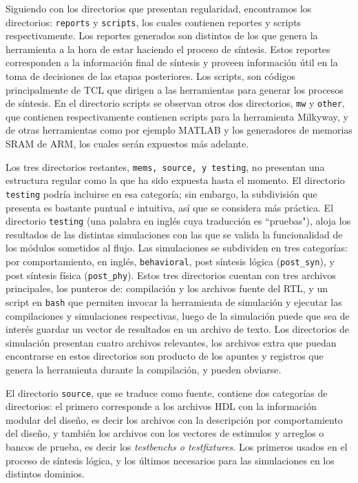 Siguiendo con los directorios que presentan regularidad, encontramos los directorios: \texttt{reports} y \texttt{scripts}, los cuales contienen reportes y scripts respectivamente. Los reportes generados son distintos de los que genera la herramienta a la hora de estar haciendo el proceso de síntesis. Estos reportes corresponden a la información final de síntesis y proveen información útil en la toma de decisiones de las etapas posteriores. Los scripts, son códigos principalmente de TCL que dirigen a las herramientas para generar los procesos de síntesis. En el directorio scripts se observan otros dos directorios, \texttt{mw} y \texttt{other}, que contienen respectivamente contienen scripts para la herramienta Milkyway, y de otras herramientas como por ejemplo MATLAB y los generadores de memorias SRAM de ARM, los cuales serán expuestos más adelante.

Los tres directorios restantes, \texttt{mems, source, y testing}, no presentan una estructura regular como la que ha sido expuesta hasta el momento. El directorio \texttt{testing} podría incluirse en esa categoría; sin embargo, la subdivisión que presenta es bastante puntual e intuitiva, así que se considera más práctica. El directorio \texttt{testing} (una palabra en inglés cuya traducción es ``pruebas"), aloja los resultados de las distintas simulaciones con las que se valida la funcionalidad de los módulos sometidos al flujo. Las simulaciones se subdividen en tres categorías: por comportamiento, en inglés, \texttt{behavioral}, post síntesis lógica (\texttt{post\_syn}), y post síntesis física (\texttt{post\_phy}). Estos tres directorios cuentan con tres archivos principales, los punteros de: compilación y los archivos fuente del RTL, y un script en \texttt{bash} que permiten invocar la herramienta de simulación y ejecutar las compilaciones y simulaciones respectivas, luego de la simulación puede que sea de interés guardar un vector de resultados en un archivo de texto. Los directorios de simulación presentan cuatro archivos relevantes, los archivos extra que puedan encontrarse en estos directorios son producto de los apuntes y registros que genera la herramienta durante la compilación, y pueden obviarse.

El directorio \texttt{source}, que se traduce como fuente, contiene dos categorías de directorios: el primero corresponde a los archivos HDL con la información modular del diseño, es decir los archivos con la descripción por comportamiento del diseño, y también los archivos con los vectores de estimulos y arreglos o bancos de prueba, es decir los \textit{testbenchs o testfixtures}. Los primeros usados en el proceso de síntesis lógica, y los últimos necesarios para las simulaciones en los distintos dominios.

